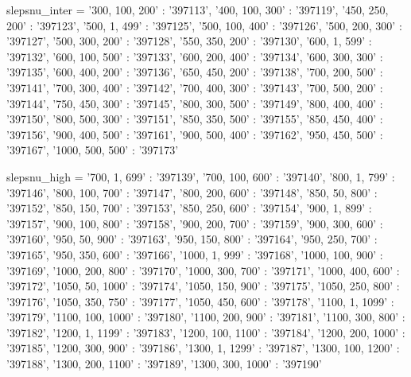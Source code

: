 slepsnu_inter = {'300, 100, 200' : '397113',
    '400, 100, 300' : '397119',
    '450, 250, 200' : '397123',
    '500, 1, 499' : '397125',
    '500, 100, 400' : '397126',
    '500, 200, 300' : '397127',
    '500, 300, 200' : '397128',
    '550, 350, 200' : '397130',
    '600, 1, 599' : '397132',
    '600, 100, 500' : '397133',
    '600, 200, 400' : '397134',
    '600, 300, 300' : '397135',
    '600, 400, 200' : '397136',
    '650, 450, 200' : '397138',
    '700, 200, 500' : '397141',
    '700, 300, 400' : '397142',
    '700, 400, 300' : '397143',
    '700, 500, 200' : '397144',
    '750, 450, 300' : '397145',
    '800, 300, 500' : '397149',
    '800, 400, 400' : '397150',
    '800, 500, 300' : '397151',
    '850, 350, 500' : '397155',
    '850, 450, 400' : '397156',
    '900, 400, 500' : '397161',
    '900, 500, 400' : '397162',
    '950, 450, 500' : '397167',
    '1000, 500, 500' : '397173'}





slepsnu_high = {'700, 1, 699' : '397139',
                '700, 100, 600' : '397140',
                '800, 1, 799' : '397146',
                '800, 100, 700' : '397147',
                '800, 200, 600' : '397148',
                '850, 50, 800' : '397152',
                '850, 150, 700' : '397153',
                '850, 250, 600' : '397154',
                '900, 1, 899' : '397157',
                '900, 100, 800' : '397158',
                '900, 200, 700' : '397159',
                '900, 300, 600' : '397160',
                '950, 50, 900' : '397163',
                '950, 150, 800' : '397164',
                '950, 250, 700' : '397165',
                '950, 350, 600' : '397166',
                '1000, 1, 999' : '397168',
                '1000, 100, 900' : '397169',
                '1000, 200, 800' : '397170',
                '1000, 300, 700' : '397171',
                '1000, 400, 600' : '397172',
                '1050, 50, 1000' : '397174',
                '1050, 150, 900' : '397175',
                '1050, 250, 800' : '397176',
                '1050, 350, 750' : '397177',
                '1050, 450, 600' : '397178',
                '1100, 1, 1099' : '397179',
                '1100, 100, 1000' : '397180',
                '1100, 200, 900' : '397181',
                '1100, 300, 800' : '397182',
                '1200, 1, 1199' : '397183',
                '1200, 100, 1100' : '397184',
                '1200, 200, 1000' : '397185',
                '1200, 300, 900' : '397186',
                '1300, 1, 1299' : '397187',
                '1300, 100, 1200' : '397188',
                '1300, 200, 1100' : '397189',
                '1300, 300, 1000' : '397190'}



